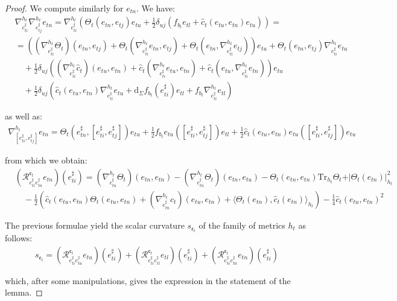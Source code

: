 \documentclass[10pt,reqno,a4paper]{amsart}
\theoremstyle{plain}
\theoremstyle{definition}
\theoremstyle{remark}
\theoremstyle{remark}
\def\dd{\mathrm{d}}
\newcommand{\Tr}{\mathrm{Tr}}
\def\cR{{\mathcal R}}
\def\fre{\mathfrak{e}}
\renewcommand{\(}{ (}
\renewcommand{\)}{ )}
\begin{document}
\begin{proof}
\noindent
We compute similarly for $e_{tn}$. We have:
\begin{eqnarray*}
& \nabla^{h_t}_{e^{\sharp}_{ti}}\nabla^{h_t}_{e_{tj}^{\sharp}}e_{tn}=\nabla^{h_t}_{e^{\sharp}_{ti}}(\Theta_t(e_{tn},e_{tj})e_{tu}+\frac{1}{2}\delta_{uj}(f_{b_t}e_{tl}+\widehat{c}_t (e_{tu},e_{tn})e_{tu}))=\\
&=((\nabla^{h_t}_{e^{\sharp}_{ti}}\Theta_t)(e_{tn},e_{tj})+\Theta_t(\nabla^{h_t}_{e^{\sharp}_{ti}}e_{tn},e_{tj})+\Theta_t(e_{tn},\nabla^{h_t}_{e^{\sharp}_{ti}}e_{tj}))e_{tu}+\Theta_t(e_{tn},e_{tj})\nabla^{h_t}_{e^{\sharp}_{ti}}e_{tu}\\
&\quad+\frac{1}{2}\delta_{uj}((\nabla^{h_t}_{e^{\sharp}_{ti}}\widehat{c}_t )(e_{tu},e_{tn})+\widehat{c}_t (\nabla^{h_t}_{e^{\sharp}_{ti}}e_{tu},e_{tn})+\widehat{c}_t (e_{tu},\nabla^{h_t}_{e^{\sharp}_{ti}}e_{tn}))e_{tu}\\
&\quad+\frac{1}{2}\delta_{uj}(\widehat{c}_t (e_{tu},e_{tn})\nabla^{h_t}_{e^{\sharp}_{ti}}e_{tu}+\dd_{\Sigma}f_{b_t}(e^{\sharp}_{ti})e_{tl}+f_{b_t}\nabla^{h_t}_{e^{\sharp}_{ti}}e_{tl})
\end{eqnarray*}

\noindent
as well as:
\begin{eqnarray*}
\nabla^{h_t}_{[e^{\sharp}_{ti},e_{tj}^{\sharp}]}e_{tn}=\Theta_t(e^{\sharp}_{tn},[e^{\sharp}_{ti},e_{tj}^{\sharp}])e_{tu}+\frac{1}{2}f_{b_t}e_{tu}([e^{\sharp}_{ti},e_{tj}^{\sharp}])e_{tl}+\frac{1}{2}\widehat{c}_t (e_{tu},e_{tn})e_{tu}([e^{\sharp}_{ti},e_{tj}^{\sharp}])e_{tu}
\end{eqnarray*}

\noindent
from which we obtain:
\begin{eqnarray*}
& (\cR^{\fre_t}_{e^{\sharp}_{ti} e^{\sharp}_{tn}}e_{tn})(e^{\sharp}_{ti})=(\nabla^{h_t}_{e^{\sharp}_{tu}}\Theta_t)(e_{tn},e_{tn})-(\nabla^{h_t}_{e^{\sharp}_{tn}}\Theta_t)(e_{tn},e_{tu})-\Theta_t(e_{tn},e_{tn})\Tr_{h_t}\Theta_t+\vert\Theta_t(e_{tn})\vert^2_{h_t}\\
&\quad-\frac{1}{2}(\widehat{c}_t (e_{tu},e_{tn})\Theta_t(e_{tu},e_{tn})+(\nabla^{h_t}_{e^{\sharp}_{tn}}\widehat{c}_t )(e_{tu},e_{tn})+\langle\Theta_t(e_{tn}),\widehat{c}_t (e_{tn})\rangle_{h_t})-\frac{1}{4}\widehat{c}_t (e_{tu},e_{tn})^2
\end{eqnarray*}

\noindent
The previous formulae yield the scalar curvature $s_{\fre_t}$ of the family of metrics $h_t$ as follows:
\begin{eqnarray*}
s_{\fre_t}=(\cR^{\fre_t}_{e^{\sharp}_{ti} e^{\sharp}_{tu}}e_{tu})(e^{\sharp}_{ti})+(\cR^{\fre_t}_{e^{\sharp}_{ti} e^{\sharp}_{tl}}e_{tl})(e^{\sharp}_{ti})+(\cR^{\fre_t}_{e^{\sharp}_{ti} e^{\sharp}_{tn}}e_{tn})(e^{\sharp}_{ti})
\end{eqnarray*}

\noindent
which, after some manipulations, gives the expression in the statement of the lemma.
\end{proof}
\end{document}

